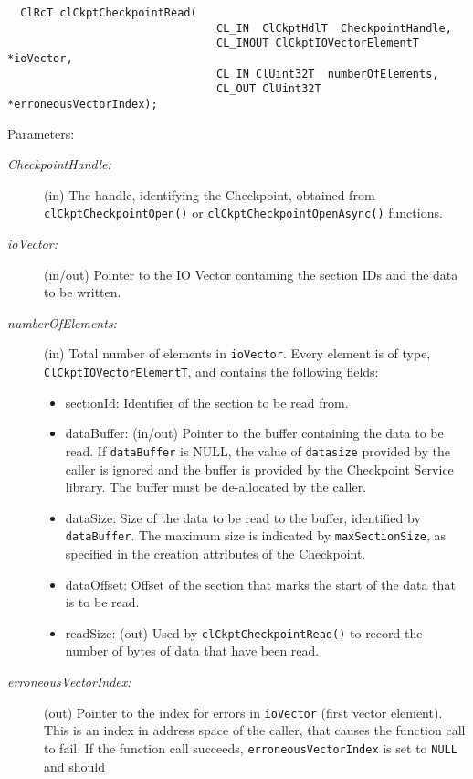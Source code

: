 \begin{flushleft}
\begin{Desc}
\footnotesize\begin{verbatim}  ClRcT clCkptCheckpointRead(
                     			CL_IN  ClCkptHdlT  CheckpointHandle,
                     			CL_INOUT ClCkptIOVectorElementT   *ioVector,
                     			CL_IN ClUint32T  numberOfElements,
                     			CL_OUT ClUint32T  *erroneousVectorIndex);
\end{verbatim}
\normalsize
\end{Desc}
\begin{Desc}
\item[Parameters:]
\begin{description}
\item[{\em Checkpoint\-Handle:}](in) The handle, identifying the Checkpoint, obtained from {\tt{clCkptCheckpointOpen()}} or 
{\tt{clCkptCheckpointOpenAsync()}} functions. 
\item[{\em io\-Vector:}](in/out) Pointer to the IO Vector containing the section IDs and the data to be written.
\item[{\em number\-Of\-Elements:}](in) Total number of elements in {\tt{io\-Vector}}. Every element is of type, 
{\tt{ClCkptIOVectorElementT}}, and contains the following fields: \begin{itemize}
\item section\-Id: Identifier of the section to be read from. 
\item data\-Buffer: (in/out) Pointer to the buffer containing the data to be read.
If {\tt{data\-Buffer}} is NULL, the value of {\tt{datasize}} provided by the caller is ignored and the buffer is provided by the Checkpoint Service 
library. The buffer must be de-allocated by the caller. 
\item data\-Size: Size of the data to be read to the buffer, identified by {\tt{data\-Buffer}}.
The maximum size is indicated by {\tt{max\-Section\-Size}}, as specified in the creation attributes of the Checkpoint. 
\item data\-Offset: Offset of the section that marks the start of the data that is to be read. 
\item read\-Size: (out) Used by {\tt{clCkptCheckpointRead()}} to record the number of bytes of data that have been read.
\end{itemize}
\item[{\em erroneous\-Vector\-Index:}](out) Pointer to the index for errors in {\tt{io\-Vector}} (first vector element). This is an index in address 
space of the caller, that causes the function call to fail.
If the function call succeeds, {\tt{erroneous\-Vector\-Index}} is set to {\tt{NULL}} and should 

\end{description}
\end{Desc}
\end{flushleft}
